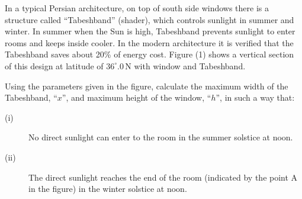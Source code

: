 In a typical Persian architecture, on top of south side windows there is a
structure called ``Tabeshband'' (shader), which controls sunlight in summer
and winter. In summer when the Sun is high, Tabeshband prevents sunlight to
enter rooms and keeps inside cooler. In the modern architecture it is verified
that the Tabeshband saves about 20\% of energy cost. Figure (1) shows a
vertical section of this design at latitude of $36^\circ\!.0$\,N with window
and Tabeshband.

Using the parameters given in the figure, calculate the maximum width of the
Tabeshband, ``$x$'', and maximum height of the window, ``$h$'', in such a way
that:
\begin{description}
\item[(i)] No direct sunlight can enter to the room in the summer solstice at
  noon.
\item[(ii)] The direct sunlight reaches the end of the room (indicated by the
  point A in the figure) in the winter solstice at noon.
\end{description}

